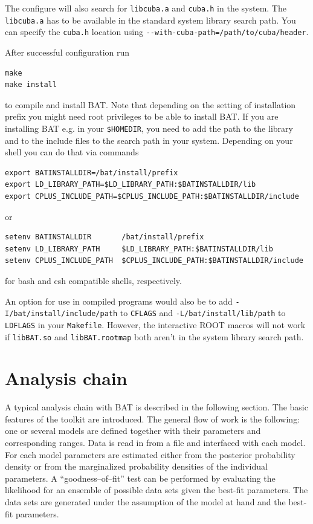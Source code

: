 \documentclass[11pt, a4paper]{article}
\begin{document}
The configure will also search for \verb|libcuba.a| and \verb|cuba.h|
in the system.  The \verb|libcuba.a| has to be available in the
standard system library search path. You can specify the \verb|cuba.h|
location using \verb|--with-cuba-path=/path/to/cuba/header|.

After successful configuration run
%
\begin{verbatim}
make
make install
\end{verbatim}
%
to compile and install BAT. Note that depending on the setting of
installation prefix you might need root privileges to be able to
install BAT. If you are installing BAT e.g. in your \verb|$HOMEDIR|,
you need to add the path to the library and to the include files to
the search path in your system. Depending on your shell you can do
that via commands
%
\begin{verbatim}
export BATINSTALLDIR=/bat/install/prefix
export LD_LIBRARY_PATH=$LD_LIBRARY_PATH:$BATINSTALLDIR/lib
export CPLUS_INCLUDE_PATH=$CPLUS_INCLUDE_PATH:$BATINSTALLDIR/include
\end{verbatim}
%
or
%
\begin{verbatim}
setenv BATINSTALLDIR       /bat/install/prefix
setenv LD_LIBRARY_PATH     $LD_LIBRARY_PATH:$BATINSTALLDIR/lib
setenv CPLUS_INCLUDE_PATH  $CPLUS_INCLUDE_PATH:$BATINSTALLDIR/include
\end{verbatim}
%
for bash and csh compatible shells, respectively.

An option for use in compiled programs would also be to add
\verb|-I/bat/install/include/path| to \verb|CFLAGS| and
\verb|-L/bat/install/lib/path| to \verb|LDFLAGS| in your
\verb|Makefile|. However, the interactive ROOT macros will not work if
\verb|libBAT.so| and \verb|libBAT.rootmap| both aren't in the system
library search path.


\pagebreak 

\section{Analysis chain}
\label{section:analysis}

A typical analysis chain with BAT is described in the following
section. The basic features of the toolkit are introduced. The general
flow of work is the following: one or several models are defined
together with their parameters and corresponding ranges. Data is read
in from a file and interfaced with each model. For each model
parameters are estimated either from the posterior probability density
or from the marginalized probability densities of the individual
parameters. A ``goodness--of--fit'' test can be performed by
evaluating the likelihood for an ensemble of possible data sets given
the best-fit parameters. The data sets are generated under the
assumption of the model at hand and the best-fit parameters. \\
\end{document}
